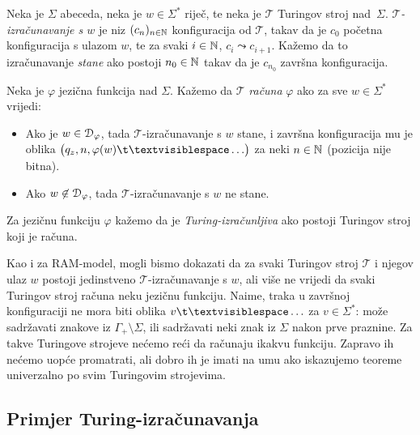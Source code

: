 \begin{definicija}[{name=[Turing-izračunljiva jezična funkcija]}]\label{def:Tcomputefi}
Neka je $\Sigma$ abeceda, neka je $w\in\Sigma^*$ riječ, te neka je $\mathcal T$ Turingov stroj nad~$\Sigma$. \emph{$\mathcal T$\!-izračunavanje s $w$} je niz $(c_n)_{n\in{\mathbb N}}$ konfiguracija od $\mathcal T$, takav da je $c_0$ početna konfiguracija s ulazom $w$, te za svaki $i\in{\mathbb N}$, $c_i\leadsto c_{i+1}$. Kažemo da to izračunavanje \emph{stane} ako postoji $n_0\in{\mathbb N}$ takav da je $c_{n_0}$ završna konfiguracija.

Neka je $\varphi$ jezična funkcija nad $\Sigma$. Kažemo da $\mathcal T$ \emph{računa} $\varphi$ ako za sve $w\in\Sigma^*$ vrijedi:
\begin{itemize}
    \item Ako je $w\in\mathcal D_{\varphi}$, tada $\mathcal T$-izračunavanje s $w$ stane, i završna konfiguracija mu je oblika $\bigl(q_z,n,\varphi(w)\bl\ldots\bigr)$ za neki $n\in{\mathbb N}$ (pozicija nije bitna).
    \item Ako $w\not\in\mathcal D_{\varphi}$, tada $\mathcal T$-izračunavanje s $w$ ne stane.
\end{itemize}
Za jezičnu funkciju $\varphi$ kažemo da je \emph{Turing-izračunljiva} ako postoji Turingov stroj koji je računa.
\end{definicija}

Kao i za RAM-model, mogli bismo dokazati da za svaki Turingov stroj $\mathcal T$ i njegov ulaz $w$ postoji jedinstveno $\mathcal T$-izračunavanje s $w$, ali više ne vrijedi da svaki Turingov stroj računa neku jezičnu funkciju. Naime, traka u završnoj konfiguraciji ne mora biti oblika $v\bl\ldots$ za $v\in\Sigma^*$: može sadržavati znakove iz $\Gamma_+\!\setminus\Sigma$, ili sadržavati neki znak iz $\Sigma$ nakon prve praznine. Za takve Turingove strojeve nećemo reći da računaju ikakvu funkciju. Zapravo ih nećemo uopće promatrati, ali dobro ih je imati na umu ako iskazujemo teoreme univerzalno po svim Turingovim strojevima.

\subsection{Primjer Turing-izračunavanja}

